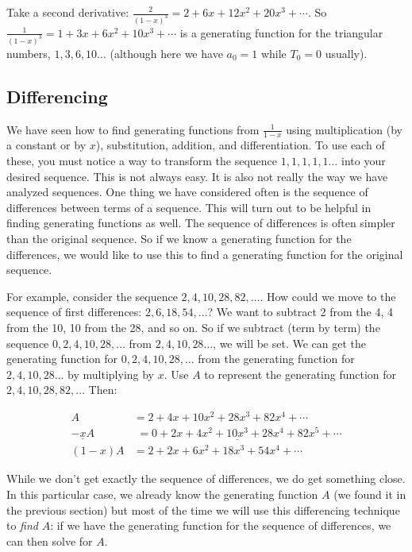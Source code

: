 \documentclass[12pt]{article}
\begin{document}
Take a second derivative: $\frac{2}{(1-x)^3} = 2 + 6x + 12x^2 + 20x^3 + \cdots$.  So $\frac{1}{(1-x)^3} = 1 + 3x + 6x^2 + 10x^3 + \cdots$ is a generating function for the triangular numbers, $1,3,6,10\ldots$ (although here we have $a_0 = 1$ while $T_0 = 0$ usually).




\subsection{Differencing}
We have seen how to find generating functions from $\frac{1}{1-x}$ using multiplication (by a constant or by $x$), substitution, addition, and differentiation.  To use each of these, you must notice a way to transform the sequence $1,1,1,1,1\ldots$ into your desired sequence.  This is not always easy.  It is also not really the way we have analyzed sequences.  One thing we have considered often is the sequence of differences between terms of a sequence.  This will turn out to be helpful in finding generating functions as well.  The sequence of differences is often simpler than the original sequence.  So if we know a generating function for the differences, we would like to use this to find a generating function for the original sequence.

For example, consider the sequence $2, 4, 10, 28, 82, \ldots$.  How could we move to the sequence of first differences: $2, 6, 18, 54,\ldots$?  We want to subtract 2 from the 4, 4 from the 10, 10 from the 28, and so on.  So if we subtract (term by term) the sequence $0, 2, 4, 10, 28,\ldots$ from $2, 4, 10, 28\ldots$, we will be set.  We can get the generating function for $0,2,4,10,28,\ldots$ from the generating function for $2,4,10,28\ldots$ by multiplying by $x$.  Use $A$ to represent the generating function for $2, 4, 10, 28, 82, \ldots $  Then:

\begin{align*}
 A & = 2 + 4x + 10x^2 +28x^3 + 82x^4 + \cdots \\
 \underline{-xA} & \underline{\,\,= 0 + 2x + 4x^2 + 10x^3 + 28 x^4 + 82x^5 + \cdots} \\
 (1-x)A & = 2 + 2x + 6x^2 + 18x^3 + 54x^4 + \cdots
\end{align*}

While we don't get exactly the sequence of differences, we do get something close.  In this particular case, we already know the generating function $A$ (we found it in the previous section) but most of the time we will use this differencing technique to {\em find} $A$: if we have the generating function for the sequence of differences, we can then solve for $A$. 
\end{document}
